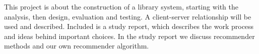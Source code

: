 This project is about the construction of a library system, starting with the analysis, then design, evaluation and testing.
A client-server relationship will be used and described.
Included is a study report, which describes the work process and ideas behind important choices. In the 
study report we discuss recommender methods and our own recommender algorithm.